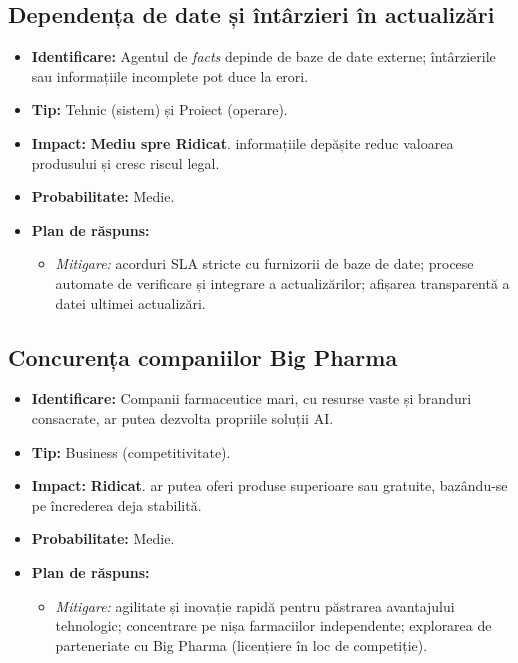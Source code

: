 \subsection{Dependența de date și întârzieri în actualizări}
\begin{itemize}
    \item \textbf{Identificare:} Agentul de \textit{facts} depinde de baze de date externe; întârzierile sau informațiile incomplete pot duce la erori.
    \item \textbf{Tip:} Tehnic (sistem) și Proiect (operare).
    \item \textbf{Impact:} \textbf{Mediu spre Ridicat}. informațiile depășite reduc valoarea produsului și cresc riscul legal.
    \item \textbf{Probabilitate:} Medie.
    \item \textbf{Plan de răspuns:}
    \begin{itemize}
        \item \textit{Mitigare:} acorduri SLA stricte cu furnizorii de baze de date; procese automate de verificare și integrare a actualizărilor; afișarea transparentă a datei ultimei actualizări.
    \end{itemize}
\end{itemize}

\subsection{Concurența companiilor Big Pharma}
\begin{itemize}
    \item \textbf{Identificare:} Companii farmaceutice mari, cu resurse vaste și branduri consacrate, ar putea dezvolta propriile soluții AI.
    \item \textbf{Tip:} Business (competitivitate).
    \item \textbf{Impact:} \textbf{Ridicat}. ar putea oferi produse superioare sau gratuite, bazându-se pe încrederea deja stabilită.
    \item \textbf{Probabilitate:} Medie.
    \item \textbf{Plan de răspuns:}
    \begin{itemize}
        \item \textit{Mitigare:} agilitate și inovație rapidă pentru păstrarea avantajului tehnologic; concentrare pe nișa farmaciilor independente; explorarea de parteneriate cu Big Pharma (licențiere în loc de competiție).
    \end{itemize}
\end{itemize}
